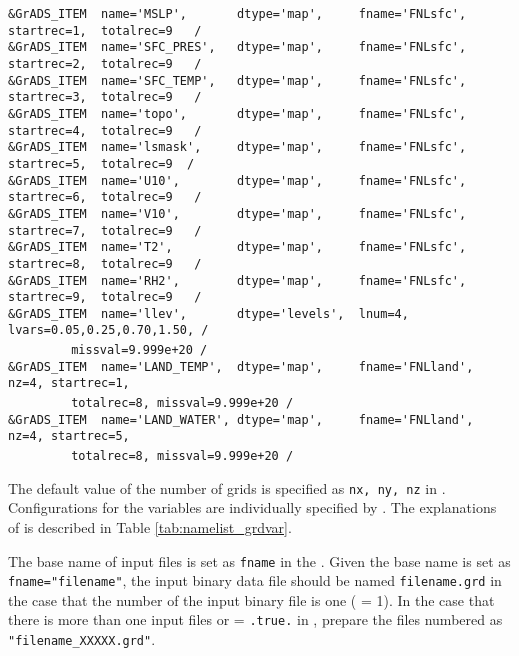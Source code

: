 {\verb|&GrADS_ITEM  name='MSLP',       dtype='map',     fname='FNLsfc', startrec=1,  totalrec=9   / |  \\
\verb|&GrADS_ITEM  name='SFC_PRES',   dtype='map',     fname='FNLsfc', startrec=2,  totalrec=9   / |  \\
\verb|&GrADS_ITEM  name='SFC_TEMP',   dtype='map',     fname='FNLsfc', startrec=3,  totalrec=9   / |  \\
\verb|&GrADS_ITEM  name='topo',       dtype='map',     fname='FNLsfc', startrec=4,  totalrec=9   / |  \\
\verb|&GrADS_ITEM  name='lsmask',     dtype='map',     fname='FNLsfc', startrec=5,  totalrec=9  /  |  \\
\verb|&GrADS_ITEM  name='U10',        dtype='map',     fname='FNLsfc', startrec=6,  totalrec=9   / |  \\
\verb|&GrADS_ITEM  name='V10',        dtype='map',     fname='FNLsfc', startrec=7,  totalrec=9   / |  \\
\verb|&GrADS_ITEM  name='T2',         dtype='map',     fname='FNLsfc', startrec=8,  totalrec=9   / |  \\
\verb|&GrADS_ITEM  name='RH2',        dtype='map',     fname='FNLsfc', startrec=9,  totalrec=9   / |  \\
\verb|&GrADS_ITEM  name='llev',       dtype='levels',  lnum=4, lvars=0.05,0.25,0.70,1.50, /        |  \\
~~~~~~~~\verb| missval=9.999e+20 /|  \\
\verb|&GrADS_ITEM  name='LAND_TEMP',  dtype='map',     fname='FNLland', nz=4, startrec=1, |\\
~~~~~~~~\verb| totalrec=8, missval=9.999e+20 /|  \\
\verb|&GrADS_ITEM  name='LAND_WATER', dtype='map',     fname='FNLland', nz=4, startrec=5, |\\
~~~~~~~~\verb| totalrec=8, missval=9.999e+20 /|  \\
}

The default value of the number of grids is specified as \verb|nx, ny, nz| in .
Configurations for the variables are individually specified by .
The explanations of  is described in Table \ref{tab:namelist_grdvar}.

The base name of input files is set as \verb|fname| in the .
Given the base name is set as \verb|fname="filename"|, the input binary data file should be named  \verb|filename.grd| in the case that the number of the input binary file is one ( = 1).
In the case that there is more than one input files or  = \verb|.true.| in ,
prepare the files numbered as \verb|"filename_XXXXX.grd"|.

